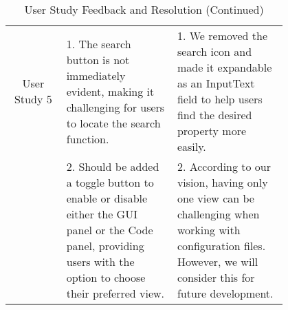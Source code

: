 \begin{table*}

    \centering
    \small %
    \setlength{\extrarowheight}{5pt} %
    \renewcommand{\arraystretch}{1.5} %
    \begin{tabular}{|c|p{0.4\linewidth}|p{0.4\linewidth}|}
        \hline
        User Study 5 & 1. The search button is not immediately evident, making it challenging for users to locate the search function. & 1. We removed the search icon and made it expandable as an InputText field to help users find the desired property more easily. \\
        \cline{2-3}
        & 2. Should be added a toggle button to enable or disable either the GUI panel or the Code panel, providing users with the option to choose their preferred view. & 2. According to our vision, having only one view can be challenging when working with configuration files. However, we will consider this for future development. \\
        \hline

    \end{tabular}
    \caption{User Study Feedback and Resolution (Continued)}
\end{table*}

















